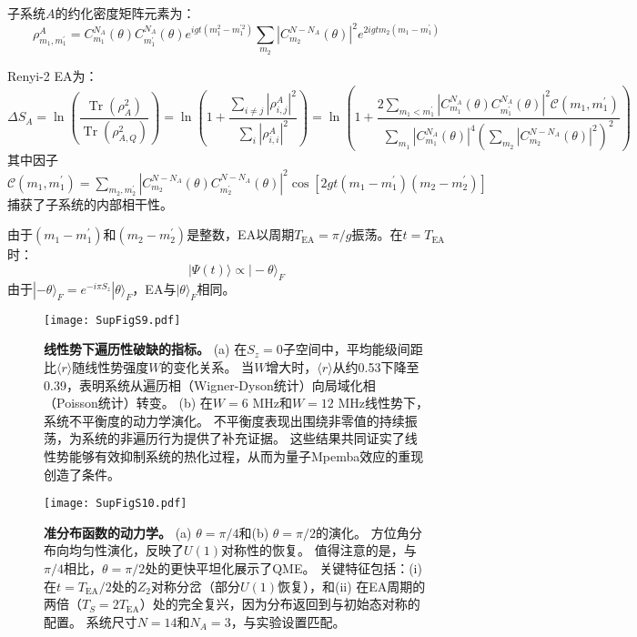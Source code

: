 \documentclass[11pt,a4paper]{article}
\begin{document}
子系统$A$的约化密度矩阵元素为：
\[
\rho^{A}_{m_1,m^{\prime}_1} = C^{N_A}_{m_1}(\theta) C^{N_A}_{m^{\prime}_1}(\theta) e^{igt(m_1^2-m^{\prime 2}_1)} \sum_{m_2} |C^{N-N_A}_{m_2}(\theta)|^2 e^{2igtm_2(m_1-m^{\prime}_1)}
\]

Renyi-2 EA为：
\[
\Delta S_A = \ln\left(\frac{\operatorname{Tr}(\rho^2_A)}{\operatorname{Tr}(\rho^2_{A,Q})}\right)
= \ln\left(1 + \frac{\sum_{i\neq j}|\rho^A_{i,j}|^2}{\sum_{i}|\rho^A_{i,i}|^2}\right)
= \ln\left(1 + \frac{2\sum_{m_1<m^{\prime}_1}|C^{N_A}_{m_1}(\theta)C^{N_A}_{m^{\prime}_1}(\theta)|^2 \mathcal{C}(m_1,m^{\prime}_1)}{\sum_{m_1}|C^{N_A}_{m_1}(\theta)|^4 \left(\sum_{m_2}|C^{N-N_A}_{m_2}(\theta)|^2\right)^2}\right)
\]
其中因子$\mathcal{C}(m_1,m^{\prime}_1) = \sum_{m_2,m^{\prime}_2}|C^{N-N_A}_{m_2}(\theta)C^{N-N_A}_{m^{\prime}_2}(\theta)|^2 \cos[2gt(m_1-m^{\prime}_1)(m_2-m^{\prime}_2)]$捕获了子系统的内部相干性。

由于$(m_1-m^{\prime}_1)$和$(m_2-m^{\prime}_2)$是整数，EA以周期$T_{\text{EA}} = \pi/g$振荡。在$t=T_{\text{EA}}$时：
\[
|\Psi(t)\rangle \propto |-\theta\rangle_F
\]
由于$|-\theta\rangle_F = e^{-i\pi S_z}|\theta\rangle_F$，EA与$|\theta\rangle_F$相同。

\begin{figure}[H]
    \centering
    \texttt{[image: SupFigS9.pdf]}
    \caption{
        \textbf{线性势下遍历性破缺的指标。}
        (a) 在$S_z=0$子空间中，平均能级间距比$\langle r\rangle$随线性势强度$W$的变化关系。
        当$W$增大时，$\langle r\rangle$从约0.53下降至0.39，表明系统从遍历相（Wigner-Dyson统计）向局域化相（Poisson统计）转变。
        (b) 在$W=6$ MHz和$W=12$ MHz线性势下，系统不平衡度的动力学演化。
        不平衡度表现出围绕非零值的持续振荡，为系统的非遍历行为提供了补充证据。
        这些结果共同证实了线性势能够有效抑制系统的热化过程，从而为量子Mpemba效应的重现创造了条件。
    }
    \label{fig:ergodicity_breaking_indicators}
\end{figure}

\begin{figure}[H]
    \centering
    \texttt{[image: SupFigS10.pdf]}
    \caption{
        \textbf{准分布函数的动力学。}
        (a) $\theta=\pi/4$和(b) $\theta=\pi/2$的演化。
        方位角分布向均匀性演化，反映了$U(1)$对称性的恢复。
        值得注意的是，与$\pi/4$相比，$\theta=\pi/2$处的更快平坦化展示了QME。
        关键特征包括：(i) 在$t=T_{\text{EA}}/2$处的$Z_2$对称分岔（部分$U(1)$恢复），和(ii) 在EA周期的两倍（$T_S=2T_{\text{EA}}$）处的完全复兴，因为分布返回到与初始态对称的配置。
        系统尺寸$N=14$和$N_A=3$，与实验设置匹配。
    }
    \label{fig:quasidistribution_dynamics}
\end{figure}
\end{document}
